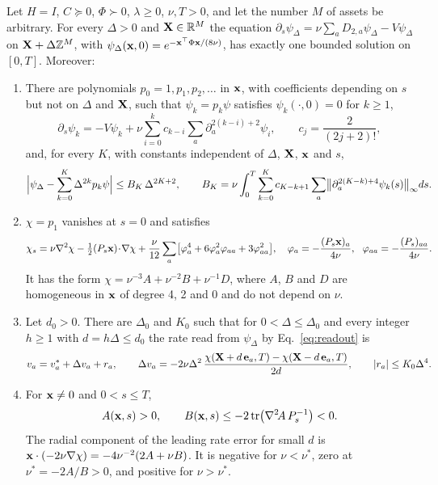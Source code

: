 \begin{theorem}
\label{thm:grid}
Let $H=I$, $C\succeq0$, $\Phi\succ0$, $\lambda\ge0$, $\nu,T>0$, and let the
number $M$ of assets be arbitrary. For every $\Delta>0$ and $\mathbf X\in\mathbb R^M$
the equation $\partial_s\psi_\Delta=\nu\sum_aD_{2,a}\psi_\Delta-V\psi_\Delta$ on
$\mathbf X+\Delta\mathbb Z^M$, with $\psi_\Delta(\mathbf x,0)=e^{-\mathbf x^\top\Phi\mathbf x/(8\nu)}$, has
exactly one bounded solution on $[0,T]$. Moreover:
\begin{enumerate}
\item[(i)] There are polynomials $p_0=1,p_1,p_2,\dots$ in $\mathbf x$, with
coefficients depending on $s$ but not on $\Delta$ and $\mathbf X$, such that
$\psi_k=p_k\psi$ satisfies $\psi_k(\cdot,0)=0$ for $k\ge1$,
\begin{equation}
 \partial_s\psi_k=-V\psi_k+\nu\sum_{i=0}^kc_{k-i}\sum_a\partial_a^{2(k-i)+2}\psi_i,
 \qquad c_j=\frac2{(2j+2)!},
 \label{eq:hier}
\end{equation}
and, for every $K$, with constants independent of $\Delta$, $\mathbf X$, $\mathbf x$ and $s$,
\begin{equation}
 \Bigl|\psi_\Delta-\sum_{k=0}^K\Delta^{2k}p_k\psi\Bigr|\le B_K\,\Delta^{2K+2},\qquad
 B_K=\nu\int_0^T\sum_{k=0}^Kc_{K-k+1}\sum_a
 \bigl\|\partial_a^{2(K-k)+4}\psi_k(s)\bigr\|_\infty ds .
 \label{eq:bk}
\end{equation}
\item[(ii)] $\chi=p_1$ vanishes at $s=0$ and satisfies
\begin{equation}
 \chi_s=\nu\nabla^2\chi-\tfrac12(P_s\x)\!\cdot\!\nabla\chi
 +\frac\nu{12}\sum_a\bigl[\varphi_a^4+6\varphi_a^2\varphi_{aa}+3\varphi_{aa}^2\bigr],
 \quad \varphi_a=-\frac{(P_s\x)_a}{4\nu},\ \ \varphi_{aa}=-\frac{(P_s)_{aa}}{4\nu}.
 \label{eq:chi}
\end{equation}
It has the form $\chi=\nu^{-3}A+\nu^{-2}B+\nu^{-1}D$, where $A$, $B$ and $D$ are homogeneous in
$\mathbf x$ of degree 4, 2 and 0 and do not depend on $\nu$.
\item[(iii)] Let $d_0>0$. There are $\Delta_0$ and $K_0$ such that for
$0<\Delta\le\Delta_0$ and every integer $h\ge1$ with $d=h\Delta\le d_0$ the rate read from
$\psi_\Delta$ by Eq.~\eqref{eq:readout} is
\begin{equation}
 v_a=v_a^*+\Delta v_a+r_a,\qquad
 \Delta v_a=-2\nu\Delta^2\,\frac{\chi(\mathbf X+d\,\mathbf e_a,T)-\chi(\mathbf X-d\,\mathbf e_a,T)}{2d},
 \qquad|r_a|\le K_0\Delta^4.
 \label{eq:dv}
\end{equation}
\item[(iv)] For $\mathbf x\ne0$ and $0<s\le T$,
\begin{equation}
 A(\mathbf x,s)>0,\qquad B(\mathbf x,s)\le-2\operatorname{tr}\bigl(\nabla^2\!A\,P_s^{-1}\bigr)<0 .
 \label{eq:signs}
\end{equation}
The radial component of the leading rate error for small $d$ is
$\mathbf x\cdot(-2\nu\nabla\chi)=-4\nu^{-2}(2A+\nu B)$. It is negative for $\nu<\nu^*$, zero at
$\nu^*=-2A/B>0$, and positive for $\nu>\nu^*$.
\end{enumerate}
\end{theorem}
